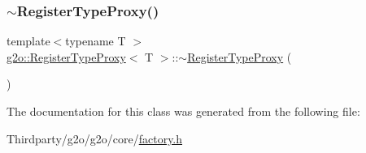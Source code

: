 \mbox{\label{classg2o_1_1_register_type_proxy_ab8469d11a8e3548e74b1de4b3a332d4e}} 
\subsubsection{\texorpdfstring{$\sim$\+Register\+Type\+Proxy()}{~RegisterTypeProxy()}}
{\footnotesize\ttfamily template$<$typename T $>$ \\
\mbox{\hyperlink{classg2o_1_1_register_type_proxy}{g2o\+::\+Register\+Type\+Proxy}}$<$ T $>$\+::$\sim$\mbox{\hyperlink{classg2o_1_1_register_type_proxy}{Register\+Type\+Proxy}} (\begin{DoxyParamCaption}{ }\end{DoxyParamCaption})\hspace{0.3cm}{\ttfamily [inline]}}



The documentation for this class was generated from the following file\+:\begin{DoxyCompactItemize}
\item 
Thirdparty/g2o/g2o/core/\mbox{\hyperlink{factory_8h}{factory.\+h}}\end{DoxyCompactItemize}
